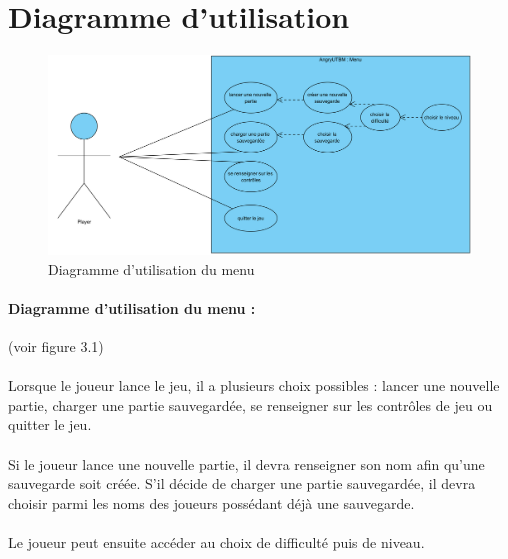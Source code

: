 \documentclass[a4paper,12pt]{report}
\begin{document}
\section{Diagramme d'utilisation}

\begin{figure}[H]
\begin{center}
\includegraphics[scale=0.2]{images/UseCase1.png} 
\end{center}
\caption{Diagramme d'utilisation du menu}
\label{Diagramme d'utilisation du menu}
\end{figure}

\paragraph{Diagramme d'utilisation du menu :}(voir figure 3.1)

\paragraph{}Lorsque le joueur lance le jeu, il a plusieurs choix possibles : lancer une nouvelle partie, charger une partie sauvegardée, se renseigner sur les contrôles de jeu ou quitter le jeu.
\paragraph{}Si le joueur lance une nouvelle partie, il devra renseigner son nom afin qu'une sauvegarde soit créée. S'il décide de charger une partie sauvegardée, il devra choisir parmi les noms des joueurs possédant déjà une sauvegarde.
\paragraph{}Le joueur peut ensuite accéder au choix de difficulté puis de niveau.
\end{document}

